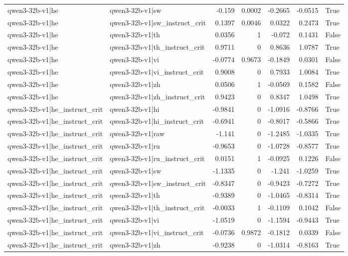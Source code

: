 \begin{table}
\begin{tabular}{l l r r r r l}
qwen3-32b-v1|he & qwen3-32b-v1|sw & -0.159 & 0.0002 & -0.2665 & -0.0515 & True \\
qwen3-32b-v1|he & qwen3-32b-v1|sw_instruct_crit & 0.1397 & 0.0046 & 0.0322 & 0.2473 & True \\
qwen3-32b-v1|he & qwen3-32b-v1|th & 0.0356 & 1 & -0.072 & 0.1431 & False \\
qwen3-32b-v1|he & qwen3-32b-v1|th_instruct_crit & 0.9711 & 0 & 0.8636 & 1.0787 & True \\
qwen3-32b-v1|he & qwen3-32b-v1|vi & -0.0774 & 0.9673 & -0.1849 & 0.0301 & False \\
qwen3-32b-v1|he & qwen3-32b-v1|vi_instruct_crit & 0.9008 & 0 & 0.7933 & 1.0084 & True \\
qwen3-32b-v1|he & qwen3-32b-v1|zh & 0.0506 & 1 & -0.0569 & 0.1582 & False \\
qwen3-32b-v1|he & qwen3-32b-v1|zh_instruct_crit & 0.9423 & 0 & 0.8347 & 1.0498 & True \\
qwen3-32b-v1|he_instruct_crit & qwen3-32b-v1|hi & -0.9841 & 0 & -1.0916 & -0.8766 & True \\
qwen3-32b-v1|he_instruct_crit & qwen3-32b-v1|hi_instruct_crit & -0.6941 & 0 & -0.8017 & -0.5866 & True \\
qwen3-32b-v1|he_instruct_crit & qwen3-32b-v1|raw & -1.141 & 0 & -1.2485 & -1.0335 & True \\
qwen3-32b-v1|he_instruct_crit & qwen3-32b-v1|ru & -0.9653 & 0 & -1.0728 & -0.8577 & True \\
qwen3-32b-v1|he_instruct_crit & qwen3-32b-v1|ru_instruct_crit & 0.0151 & 1 & -0.0925 & 0.1226 & False \\
qwen3-32b-v1|he_instruct_crit & qwen3-32b-v1|sw & -1.1335 & 0 & -1.241 & -1.0259 & True \\
qwen3-32b-v1|he_instruct_crit & qwen3-32b-v1|sw_instruct_crit & -0.8347 & 0 & -0.9423 & -0.7272 & True \\
qwen3-32b-v1|he_instruct_crit & qwen3-32b-v1|th & -0.9389 & 0 & -1.0465 & -0.8314 & True \\
qwen3-32b-v1|he_instruct_crit & qwen3-32b-v1|th_instruct_crit & -0.0033 & 1 & -0.1109 & 0.1042 & False \\
qwen3-32b-v1|he_instruct_crit & qwen3-32b-v1|vi & -1.0519 & 0 & -1.1594 & -0.9443 & True \\
qwen3-32b-v1|he_instruct_crit & qwen3-32b-v1|vi_instruct_crit & -0.0736 & 0.9872 & -0.1812 & 0.0339 & False \\
qwen3-32b-v1|he_instruct_crit & qwen3-32b-v1|zh & -0.9238 & 0 & -1.0314 & -0.8163 & True \\

\end{tabular}
\end{table}
